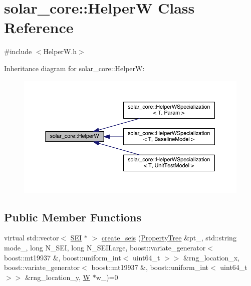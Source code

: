 \hypertarget{classsolar__core_1_1_helper_w}{}\section{solar\+\_\+core\+:\+:Helper\+W Class Reference}
\label{classsolar__core_1_1_helper_w}


{\ttfamily \#include $<$Helper\+W.\+h$>$}



Inheritance diagram for solar\+\_\+core\+:\+:Helper\+W\+:
\nopagebreak
\begin{figure}[H]
\begin{center}
\leavevmode
\includegraphics[width=350pt]{classsolar__core_1_1_helper_w__inherit__graph}
\end{center}
\end{figure}
\subsection*{Public Member Functions}
\begin{DoxyCompactItemize}
\item 
virtual std\+::vector$<$ \hyperlink{classsolar__core_1_1_s_e_i}{S\+E\+I} $\ast$ $>$ \hyperlink{classsolar__core_1_1_helper_w_a2d53e9a0f5945ced5ddc0388278d2336}{create\+\_\+seis} (\hyperlink{namespacesolar__core_adeda2737d6938c190eb774a5b2495045}{Property\+Tree} \&pt\+\_\+, std\+::string mode\+\_\+, long N\+\_\+\+S\+E\+I, long N\+\_\+\+S\+E\+I\+Large, boost\+::variate\+\_\+generator$<$ boost\+::mt19937 \&, boost\+::uniform\+\_\+int$<$ uint64\+\_\+t $>$$>$ \&rng\+\_\+location\+\_\+x, boost\+::variate\+\_\+generator$<$ boost\+::mt19937 \&, boost\+::uniform\+\_\+int$<$ uint64\+\_\+t $>$$>$ \&rng\+\_\+location\+\_\+y, \hyperlink{classsolar__core_1_1_w}{W} $\ast$w\+\_\+)=0
\end{DoxyCompactItemize}


